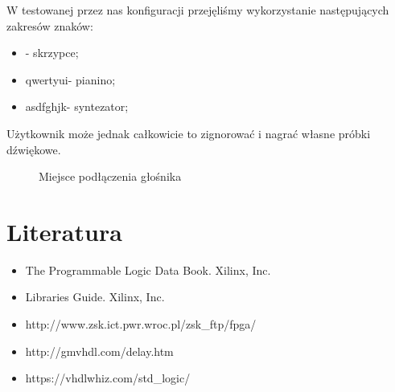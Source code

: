 \documentclass{article}
\begin{document}
W testowanej przez nas konfiguracji przejęliśmy wykorzystanie następujących zakresów znaków:

\begin{itemize}
    \item {}\rbrack - skrzypce;
    \item \lbrack qwertyui\rbrack - pianino;
    \item \lbrack asdfghjk\rbrack - syntezator;
\end{itemize}

Użytkownik może jednak całkowicie to zignorować i nagrać własne próbki dźwiękowe.

\begin{figure}[H]
    \centering
    \caption{Miejsce podłączenia głośnika}
\end{figure}

\section{Literatura}

\begin{itemize}
    \item The Programmable Logic Data Book. Xilinx, Inc.
    \item Libraries Guide. Xilinx, Inc.
    \item http://www.zsk.ict.pwr.wroc.pl/zsk\_ftp/fpga/
    \item http://gmvhdl.com/delay.htm
    \item https://vhdlwhiz.com/std\_logic/
\end{itemize}
\end{document}

